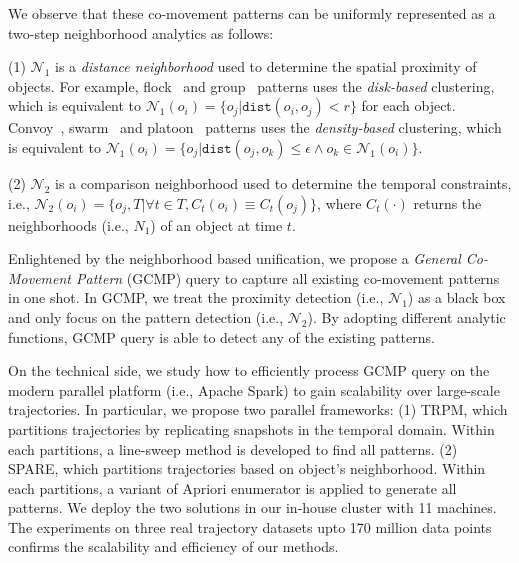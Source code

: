 We observe that these co-movement patterns can be uniformly represented as a two-step neighborhood analytics as follows:
	
	(1) $\mathcal{N}_1$ is a \emph{distance neighborhood} used to determine the spatial proximity of objects. For example,  flock~\cite{gudmundsson2006computing} and group~\cite{wang2006grouppattern} patterns uses the \emph{disk-based} clustering, which is equivalent to $\mathcal{N}_1(o_i)= \{o_j | \mathtt{dist}(o_i,o_j) < r \}$ for each object. Convoy~\cite{jeung2008discovery}, swarm~\cite{li2010swarm} and platoon~\cite{li2015platoon} patterns uses the \emph{density-based} clustering, which is equivalent to $\mathcal{N}_1(o_i)= \{o_j | \mathtt{dist}(o_j,o_k) \leq \epsilon \wedge o_k \in \mathcal{N}_1(o_i)\}$.
	
	(2) $\mathcal{N}_2$ is a comparison neighborhood used to determine the temporal constraints, i.e., $\mathcal{N}_2(o_i)=\{o_j, T | \forall t \in T, C_t(o_i) \equiv C_t(o_j)\}$, where $C_t(\cdot)$ returns the neighborhoods (i.e., $N_1$) of an object at time $t$.

Enlightened by the neighborhood based unification, we propose a \emph{General Co-Movement Pattern} (GCMP)
query to capture all existing co-movement patterns in one shot. In GCMP, we treat the proximity detection (i.e., $\mathcal{N}_1$) as
a black box and only focus on the pattern detection (i.e., $\mathcal{N}_2$). By adopting different analytic functions, GCMP
query is able to detect any of the existing patterns.
%



On the technical side, we study how to efficiently process GCMP query 
on the modern parallel platform (i.e., Apache Spark) to
gain scalability over large-scale trajectories. 
In particular, we propose two parallel frameworks: (1) TRPM, which partitions trajectories by replicating snapshots in the temporal domain. Within each partitions, a line-sweep method is developed to find all patterns. 
(2) SPARE, which partitions trajectories based on object's neighborhood. Within each partitions, a variant of Apriori enumerator is applied to generate all patterns. 
We deploy the two solutions in our in-house cluster with 11 machines. The experiments on three
real trajectory datasets upto 170 million data points confirms the scalability and efficiency 
of our methods.
%
